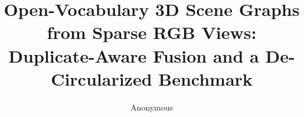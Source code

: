\documentclass[runningheads]{llncs}
\begin{document}
\title{Open-Vocabulary 3D Scene Graphs from Sparse RGB Views:\\
Duplicate-Aware Fusion and a De-Circularized Benchmark}

\author{Anonymous}

\maketitle

\begin{abstract}

\end{abstract}










\end{document}
